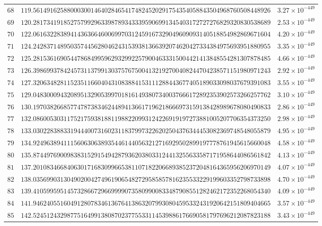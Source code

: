 \documentclass[12pt,reqno]{amsart}
\theoremstyle{remark}
\begin{document}
\begin{longtable}{clc}
$68$ & $119.5614916258800030014640284654174824520291754354058843504968760508448926$ & $3.27\times 10^{-449}$ \\
$69$ & $120.2817341918527579929633987893433395906991345403172727276829320830538689$ & $2.53\times 10^{-449}$ \\
$70$ & $122.0616322838941436366460069970312459167329049609093140518854982869671604$ & $4.20\times 10^{-449}$ \\
$71$ & $124.2428371489503574456280462431539381366392074620427334384975693951880955$ & $3.35\times 10^{-449}$ \\
$72$ & $125.2815361690544786849959629329922579004633315004421413848554281307878485$ & $4.66\times 10^{-449}$ \\
$73$ & $126.3986993784245731137991303757675004132192700408244704238571151980971243$ & $2.92\times 10^{-449}$ \\
$74$ & $127.3206348281152351166040431083884153111288443677405189033098037679391083$ & $3.55\times 10^{-449}$ \\
$75$ & $129.0483000943208951329053997018161493807340037666172892353902573266257762$ & $3.10\times 10^{-449}$ \\
$76$ & $130.1970382668577478738346244894136617196218666973159138428989678080490833$ & $2.86\times 10^{-449}$ \\
$77$ & $132.0860053031175217593818811988220993124226919197273881005207706354373250$ & $2.98\times 10^{-449}$ \\
$78$ & $133.0302283883319444007316023118379973226202504376344453082369748548055879$ & $4.95\times 10^{-449}$ \\
$79$ & $134.9249638941115606306389354461440563212716929502899197778761945615660048$ & $4.58\times 10^{-449}$ \\
$80$ & $135.8744976900983831529154942879362038033124413255633587171958644086561842$ & $4.13\times 10^{-449}$ \\
$81$ & $137.2010834668406301716830996653811071822066893852372048164365956206970149$ & $4.07\times 10^{-449}$ \\
$82$ & $138.0356990313049020042749619065482729585857816235533229199603352798733898$ & $4.70\times 10^{-449}$ \\
$83$ & $139.4105995951457328667296699990735809900833487908551282462172352268054340$ & $4.09\times 10^{-449}$ \\
$84$ & $141.9462405516049128078346136764138632079930804595332431920642151809404665$ & $3.57\times 10^{-449}$ \\
$85$ & $142.5245124329877516499138087023775533114539886176690581797696212087823188$ & $3.43\times 10^{-449}$ \\

\end{longtable}
\end{document}
